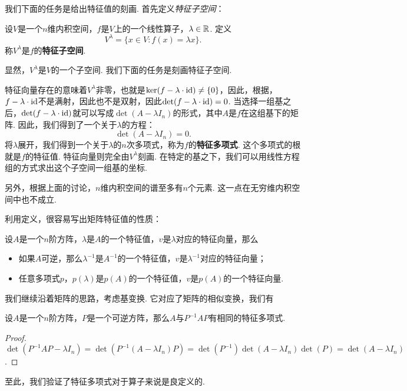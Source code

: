 我们下面的任务是给出特征值的刻画. 首先定义\emph{特征子空间}：

\begin{definition}[特征子空间]
设$V$是一个$n$维内积空间，$f$是$V$上的一个线性算子，$\lambda\in\mathbb{R}$. 定义
\[V^\lambda=\{x\in V:f(x)=\lambda x\}.\]
称$V^\lambda$是$f$的\textbf{特征子空间}. 
\end{definition}
显然，$V^\lambda$是$V$的一个子空间. 我们下面的任务是刻画特征子空间. 

特征向量存在的意味着$V^\lambda$非零，也就是$\ker(f-\lambda\cdot \mathrm{id})\neq\{0\}$，因此，根据，$f-\lambda\cdot \mathrm{id}$不是满射，因此也不是双射，因此$\det(f-\lambda\cdot \mathrm{id})=0$. 当选择一组基之后，$\det(f-\lambda\cdot \mathrm{id})$就可以写成$\det(A-\lambda I_n)$的形式，其中$A$是$f$在这组基下的矩阵. 因此，我们得到了一个关于$\lambda$的方程：
\begin{equation}\label{eq:characteristic-equation}
    \det(A-\lambda I_n)=0.
\end{equation}
将$\lambda$展开，我们得到一个关于$\lambda$的$n$次多项式，称为$f$的\textbf{特征多项式}. 这个多项式的根就是$f$的特征值. 特征向量则完全由$V^\lambda$刻画. 在特定的基之下，我们可以用线性方程组的方式求出这个子空间一组基的坐标. 

另外，根据上面的讨论，$n$维内积空间的谱至多有$n$个元素. 这一点在无穷维内积空间中也不成立. 

利用定义，很容易写出矩阵特征值的性质：
\begin{proposition}
设$A$是一个$n$阶方阵，$\lambda$是$A$的一个特征值，$v$是$\lambda$对应的特征向量，那么
\begin{itemize}
    \item 如果$A$可逆，那么$\lambda^{-1}$是$A^{-1}$的一个特征值，$v$是$\lambda^{-1}$对应的特征向量；
    \item 任意多项式$p$，$p(\lambda)$是$p(A)$的一个特征值，$v$是$p(A)$的一个特征向量. 
\end{itemize}
\end{proposition}

我们继续沿着矩阵的思路，考虑基变换. 它对应了矩阵的相似变换，我们有

\begin{proposition}\label{prop:similar-matrix-same-characteristic-polynomial}
    设$A$是一个$n$阶方阵，$P$是一个可逆方阵，那么$A$与$P^{-1}AP$有相同的特征多项式. 
\end{proposition}
\begin{proof}
    $\det(P^{-1}AP-\lambda I_n)=\det(P^{-1}(A-\lambda I_n)P)=\det(P^{-1})\det(A-\lambda I_n)\det(P)=\det(A-\lambda I_n)$.
\end{proof}
至此，我们验证了特征多项式对于算子来说是良定义的. 

